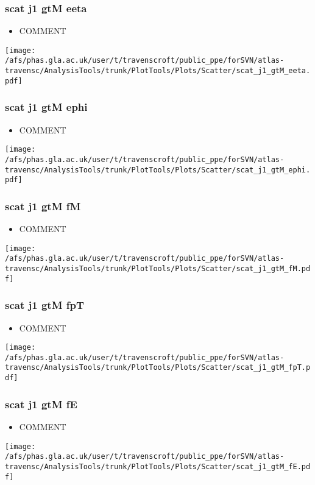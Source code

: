 \documentclass{beamer}
\begin{document}
\begin{frame}
\frametitle{scat j1 gtM eeta}
\begin{itemize}
\item COMMENT
\end{itemize}
\begin{center}
\texttt{[image: /afs/phas.gla.ac.uk/user/t/travenscroft/public\_ppe/forSVN/atlas-travensc/AnalysisTools/trunk/PlotTools/Plots/Scatter/scat\_j1\_gtM\_eeta.pdf]}
\end{center}
\end{frame}

\begin{frame}
\frametitle{scat j1 gtM ephi}
\begin{itemize}
\item COMMENT
\end{itemize}
\begin{center}
\texttt{[image: /afs/phas.gla.ac.uk/user/t/travenscroft/public\_ppe/forSVN/atlas-travensc/AnalysisTools/trunk/PlotTools/Plots/Scatter/scat\_j1\_gtM\_ephi.pdf]}
\end{center}
\end{frame}

\begin{frame}
\frametitle{scat j1 gtM fM}
\begin{itemize}
\item COMMENT
\end{itemize}
\begin{center}
\texttt{[image: /afs/phas.gla.ac.uk/user/t/travenscroft/public\_ppe/forSVN/atlas-travensc/AnalysisTools/trunk/PlotTools/Plots/Scatter/scat\_j1\_gtM\_fM.pdf]}
\end{center}
\end{frame}

\begin{frame}
\frametitle{scat j1 gtM fpT}
\begin{itemize}
\item COMMENT
\end{itemize}
\begin{center}
\texttt{[image: /afs/phas.gla.ac.uk/user/t/travenscroft/public\_ppe/forSVN/atlas-travensc/AnalysisTools/trunk/PlotTools/Plots/Scatter/scat\_j1\_gtM\_fpT.pdf]}
\end{center}
\end{frame}

\begin{frame}
\frametitle{scat j1 gtM fE}
\begin{itemize}
\item COMMENT
\end{itemize}
\begin{center}
\texttt{[image: /afs/phas.gla.ac.uk/user/t/travenscroft/public\_ppe/forSVN/atlas-travensc/AnalysisTools/trunk/PlotTools/Plots/Scatter/scat\_j1\_gtM\_fE.pdf]}
\end{center}
\end{frame}
\end{document}
